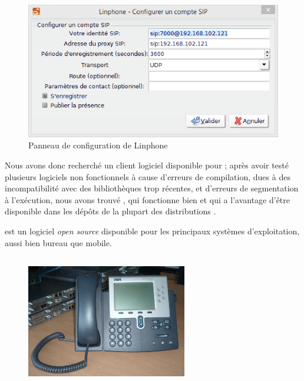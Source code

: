 \begin{figure}[h]
\begin{center}
\includegraphics[width=12cm]{images/config-linphone.png}
\end{center}
\caption{Panneau de configuration de Linphone}
\end{figure}

Nous avons donc recherché un client logiciel disponible pour {\lnx} ; après avoir testé plusieurs logiciels non fonctionnels à cause d’erreurs de compilation, dues à des incompatibilité avec des bibliothèques trop récentes, et d’erreurs de segmentation à l’exécution, nous avons trouvé {\lnp}, qui fonctionne bien et qui a l’avantage d’être disponible dans les dépôts de la plupart des distributions {\lnx}.


{\lnp} est un logiciel \textit{open source} disponible pour les principaux systèmes d’exploitation, aussi bien bureau que mobile.


\subsection{\cph}

\begin{figure}[h]
\begin{center}
\includegraphics[width=7cm]{images/7961.jpg}
\end{center}
\caption{\cph}
\end{figure}

